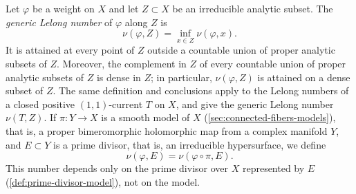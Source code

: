 \begin{proposition}\label{prop:generic-divisorial-lelong}
Let $\varphi$ be a weight on $X$ and let $Z\subset X$ be an irreducible analytic subset. The \emph{generic Lelong number} of $\varphi$ along $Z$ is
\[
 \nu(\varphi,Z)=\inf_{x\in Z}\nu(\varphi,x).
\]
It is attained at every point of $Z$ outside a countable union of proper analytic subsets of $Z$. Moreover, the complement in $Z$ of every countable union of proper analytic subsets of $Z$ is dense in $Z$; in particular, $\nu(\varphi,Z)$ is attained on a dense subset of $Z$. The same definition and conclusions apply to the Lelong numbers of a closed positive $(1,1)$-current $T$ on $X$, and give the generic Lelong number $\nu(T,Z)$. If $\pi\colon Y\to X$ is a smooth model of $X$ (\cref{sec:connected-fibers-models}), that is, a proper bimeromorphic holomorphic map from a complex manifold $Y$, and $E\subset Y$ is a prime divisor, that is, an irreducible hypersurface, we define
\[
 \nu(\varphi,E)=\nu(\varphi\circ\pi,E).
\]
This number depends only on the prime divisor over $X$ represented by $E$ (\cref{def:prime-divisor-model}), not on the model.
\end{proposition}
